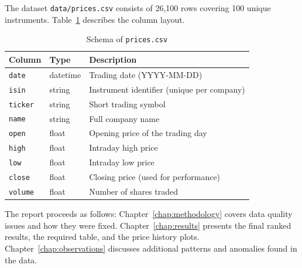 The dataset \texttt{data/prices.csv} consists of 26{,}100 rows covering 100 unique instruments. Table~\ref{tab:dataset_schema} describes the column layout.

\begin{table}[H]
\centering
\caption{Schema of \texttt{prices.csv}}
\label{tab:dataset_schema}
\begin{tabular}{lll}
\toprule
\textbf{Column} & \textbf{Type} & \textbf{Description} \\
\midrule
\texttt{date}   & datetime & Trading date (YYYY-MM-DD) \\
\texttt{isin}   & string   & Instrument identifier (unique per company) \\
\texttt{ticker} & string   & Short trading symbol \\
\texttt{name}   & string   & Full company name \\
\texttt{open}   & float    & Opening price of the trading day \\
\texttt{high}   & float    & Intraday high price \\
\texttt{low}    & float    & Intraday low price \\
\texttt{close}  & float    & Closing price (used for performance) \\
\texttt{volume} & float    & Number of shares traded \\
\bottomrule
\end{tabular}
\end{table}

\medskip
The report proceeds as follows: Chapter~\ref{chap:methodology} covers data quality issues and how they were fixed. Chapter~\ref{chap:results} presents the final ranked results, the required table, and the price history plots. Chapter~\ref{chap:observations} discusses additional patterns and anomalies found in the data.
